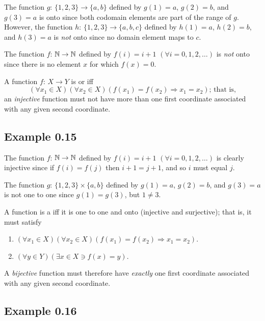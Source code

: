 The function $g$: $\{1,2,3\}\rightarrow\{a,b\}$ defined by $g(1) = a$,
$g(2) = b$, and $g(3) = a$ is onto since both codomain elements are part of the
range of $g$. However, the function $h$: $\{1, 2, 3\}\rightarrow \{a, b, c\}$
defined by $h(1) = a$, $h(2) = b$, and $h(3) = a$ is \emph{not} onto since no domain
element maps to $c$.

The function $f$: $\mathbb{N} \rightarrow \mathbb{N}$ defined by $f(i)=i+1$ $(\forall i=0,1,2,
\ldots)$ is \emph{not} onto since there is no element $x$ for which $f(x)=0$.

\begin{dfn}\label{dfn-0.15}
A function $f$: $X \rightarrow Y$ is \emph{} or
\emph{} iff
\[(\forall x_1 \in X)(\forall x_2 \in X)(f(x_1) = f(x_2)
	\Rightarrow x_1 = x_2)\text{; that is,}\]
an \emph{injective} function must not have more than one first coordinate
associated with any given second coordinate.
\end{dfn}

\subsection*{Example 0.15}

The function $f$: $\mathbb{N} \rightarrow \mathbb{N}$ defined by $f(i)=i+1$ $(\forall i=0,1,2,
\ldots)$ is clearly injective since if $f(i)= f(j)$ then $i+1=j+1$, and so $i$
must equal $j$.

The function $g$: $\{1,2,3\}\times\{a,b\}$ defined by $g(1)=a$, $g(2)=b$,
and $g(3)=a$ is not one to one since $g(1)=g(3)$, but $1\not= 3$.

\begin{dfn}\label{dfn-0.16}
A function is a \emph{} iff it is one to one and onto
(injective and surjective); that is, it must satisfy
\begin{enumerate}
\item $(\forall x_1 \in X)(\forall x_2 \in X)(f(x_1) = f(x_2) \Rightarrow x_1 =
	x_2)$.
\item $(\forall y \in Y)(\exists x \in X \ni f(x) = y)$.
\end{enumerate}
\end{dfn}

A \emph{bijective} function must therefore have \emph{exactly} one first
coordinate associated with any given second coordinate.

\subsection*{Example 0.16}

